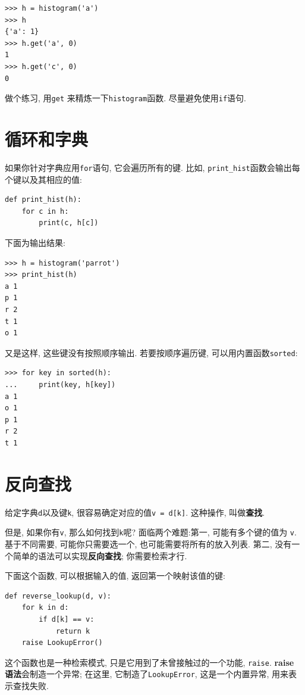 \documentclass[10pt]{book}
\begin{document}
\begin{verbatim}
>>> h = histogram('a')
>>> h
{'a': 1}
>>> h.get('a', 0)
1
>>> h.get('c', 0)
0
\end{verbatim}
%
做个练习, 用{\tt get} 来精炼一下{\tt histogram}函数. 
尽量避免使用{\tt if}语句. 

\section{循环和字典}

如果你针对字典应用{\tt for}语句, 它会遍历所有的键. 
比如, \verb"print_hist"函数会输出每个键以及其相应的值:

\begin{verbatim}
def print_hist(h):
    for c in h:
        print(c, h[c])
\end{verbatim}
%
下面为输出结果:

\begin{verbatim}
>>> h = histogram('parrot')
>>> print_hist(h)
a 1
p 1
r 2
t 1
o 1
\end{verbatim}
%
又是这样, 这些键没有按照顺序输出. 
若要按顺序遍历键, 可以用内置函数{\tt sorted}:

\begin{verbatim}
>>> for key in sorted(h):
...     print(key, h[key])
a 1
o 1
p 1
r 2
t 1
\end{verbatim}



\section{反向查找}
\label{raise}

给定字典{\tt d}以及键{\tt k}, 很容易确定对应的值{\tt v = d[k]}. 
这种操作, 叫做{\bf 查找}.

但是, 如果你有{\tt v}, 那么如何找到{\tt k}呢?
面临两个难题:第一, 可能有多个键的值为 {\tt v}. 
基于不同需要, 可能你只需要选一个, 也可能需要将所有的放入列表. 
第二, 没有一个简单的语法可以实现{\bf 反向查找}; 你需要检索才行.

下面这个函数, 可以根据输入的值, 返回第一个映射该值的键:

\begin{verbatim}
def reverse_lookup(d, v):
    for k in d:
        if d[k] == v:
            return k
    raise LookupError()
\end{verbatim}
%
这个函数也是一种检索模式, 只是它用到了未曾接触过的一个功能, {\tt raise}. 
{\bf raise 语法}会制造一个异常;
在这里, 它制造了{\tt LookupError}, 这是一个内置异常, 用来表示查找失败. 
  
 
\end{document}
